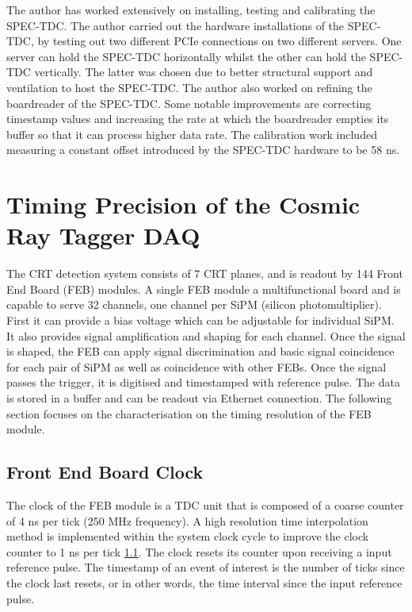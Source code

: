 The author has worked extensively on installing, testing and calibrating the SPEC-TDC.
The author carried out the hardware installations of the SPEC-TDC, by testing out two different PCIe connections on two different servers. 
One server can hold the SPEC-TDC horizontally whilst the other can hold the SPEC-TDC vertically. 
The latter was chosen due to better structural support and ventilation to host the SPEC-TDC.
The author also worked on refining the boardreader of the SPEC-TDC. Some notable improvements are correcting timestamp values and increasing the rate at which the boardreader empties its buffer so that it can process higher data rate.
The calibration work included measuring a constant offset introduced by the SPEC-TDC hardware to be 58 ns.

\section{Timing Precision of the Cosmic Ray Tagger DAQ}
\label{section5.3}

The CRT detection system consists of 7 CRT planes, and is readout by 144 Front End Board (FEB) modules. 
A single FEB module a multifunctional board and is capable to serve 32 channels, one channel per SiPM (silicon photomultiplier). 
First it can provide a bias voltage which can be adjustable for individual SiPM.
It also provides signal amplification and shaping for each channel.
Once the signal is shaped, the FEB can apply signal discrimination and basic signal coincidence for each pair of SiPM as well as coincidence with other FEBs.
Once the signal passes the trigger, it is digitised and timestamped with reference pulse.
The data is stored in a buffer and can be readout via Ethernet connection.
The following section focuses on the characterisation on the timing resolution of the FEB module.


\subsection{Front End Board Clock}

The clock of the FEB module is a TDC unit that is composed of a coarse counter of 4 ns per tick (250 MHz frequency). 
A high resolution time interpolation method is implemented within the system clock cycle to improve the clock counter to 1 ns per tick \ref{}.
The clock resets its counter upon receiving a input reference pulse.  
The timestamp of an event of interest is the number of ticks since the clock last resets, or in other words, the time interval since the input reference pulse.


